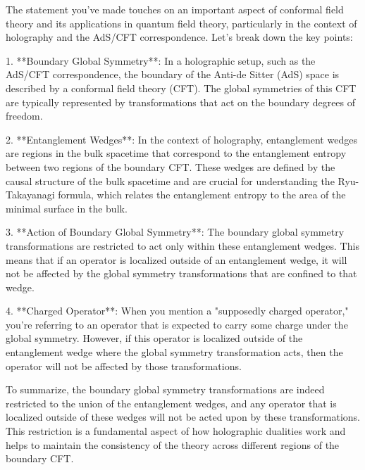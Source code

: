 The statement you've made touches on an important aspect of conformal field theory and its applications in quantum field theory, particularly in the context of holography and the AdS/CFT correspondence. Let's break down the key points:

1. **Boundary Global Symmetry**: In a holographic setup, such as the AdS/CFT correspondence, the boundary of the Anti-de Sitter (AdS) space is described by a conformal field theory (CFT). The global symmetries of this CFT are typically represented by transformations that act on the boundary degrees of freedom.

2. **Entanglement Wedges**: In the context of holography, entanglement wedges are regions in the bulk spacetime that correspond to the entanglement entropy between two regions of the boundary CFT. These wedges are defined by the causal structure of the bulk spacetime and are crucial for understanding the Ryu-Takayanagi formula, which relates the entanglement entropy to the area of the minimal surface in the bulk.

3. **Action of Boundary Global Symmetry**: The boundary global symmetry transformations are restricted to act only within these entanglement wedges. This means that if an operator is localized outside of an entanglement wedge, it will not be affected by the global symmetry transformations that are confined to that wedge.

4. **Charged Operator**: When you mention a "supposedly charged operator," you're referring to an operator that is expected to carry some charge under the global symmetry. However, if this operator is localized outside of the entanglement wedge where the global symmetry transformation acts, then the operator will not be affected by those transformations.

To summarize, the boundary global symmetry transformations are indeed restricted to the union of the entanglement wedges, and any operator that is localized outside of these wedges will not be acted upon by these transformations. This restriction is a fundamental aspect of how holographic dualities work and helps to maintain the consistency of the theory across different regions of the boundary CFT.